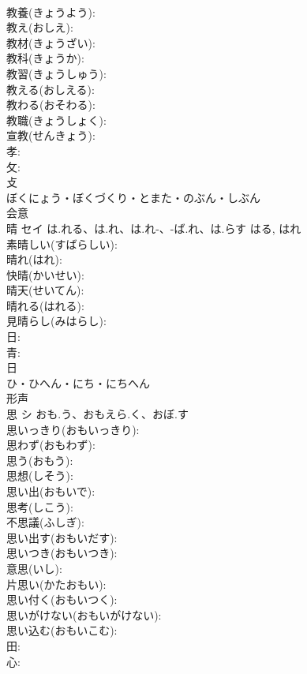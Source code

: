 \documentclass[8pt]{extreport}
\begin{document}
\begin{CJK}{UTF8}{min}
\\	教養(きょうよう): 
\\	教え(おしえ): 
\\	教材(きょうざい): 
\\	教科(きょうか): 
\\	教習(きょうしゅう): 
\\	教える(おしえる): 
\\	教わる(おそわる): 
\\	教職(きょうしょく): 
\\	宣教(せんきょう): 
\\	孝: 
\\	攵: 
\\	攴	
\\	ぼくにょう・ぼくづくり・とまた・のぶん・しぶん	
\\	会意 
\\	晴	セイ	は.れる、は.れ、は.れ-、-ば.れ、は.らす	はる, はれ	
\\	素晴しい(すばらしい): 
\\	晴れ(はれ): 
\\	快晴(かいせい): 
\\	晴天(せいてん): 
\\	晴れる(はれる): 
\\	見晴らし(みはらし): 
\\	日: 
\\	青: 
\\	日	
\\	ひ・ひへん・にち・にちへん	
\\	形声 
\\	思	シ	おも.う、おもえら.く、おぼ.す		
\\	思いっきり(おもいっきり): 
\\	思わず(おもわず): 
\\	思う(おもう): 
\\	思想(しそう): 
\\	思い出(おもいで): 
\\	思考(しこう): 
\\	不思議(ふしぎ): 
\\	思い出す(おもいだす): 
\\	思いつき(おもいつき): 
\\	意思(いし): 
\\	片思い(かたおもい): 
\\	思い付く(おもいつく): 
\\	思いがけない(おもいがけない): 
\\	思い込む(おもいこむ): 
\\	田: 
\\	心: 

\end{CJK}
\end{document}
